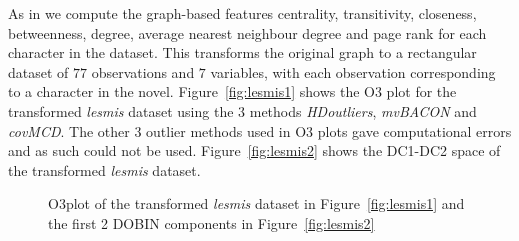 \documentclass[11pt]{article}
\begin{document}
As in \cite{wilkinson2017visualizing} we compute the graph-based features centrality, transitivity, closeness, betweenness, degree, average nearest neighbour degree and page rank for each character in the dataset. This transforms the original graph to a rectangular dataset of $77$ observations and $7$ variables, with each observation corresponding to a character in the novel.  Figure~\ref{fig:lesmis1} shows the O3 plot for the transformed \textit{lesmis} dataset using the $3$ methods \textit{HDoutliers}, \textit{mvBACON} and \textit{covMCD}. The other $3$ outlier methods used in O3 plots gave computational errors and as such could not be used.  Figure~\ref{fig:lesmis2} shows the DC1-DC2 space of the transformed \textit{lesmis} dataset.  \\

\begin{figure}
	\centering
	\caption{O3plot of the transformed \textit{lesmis} dataset in Figure~\ref{fig:lesmis1} and the first 2 DOBIN components in Figure~\ref{fig:lesmis2} }
	\label{fig:lesmis}
\end{figure}
\end{document}
